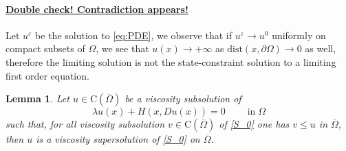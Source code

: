 \documentclass[11pt,reqno]{amsart}
\numberwithin{figure}{section}
\theoremstyle{plain}
\newtheorem{lem}[thm]{Lemma}
\theoremstyle{remark}
\numberwithin{equation}{section}
\newcommand{\rmC}{\mathrm{C}}
\begin{document}
\color{blue} 
\paragraph{\underline{\textbf{Double check! Contradiction appears!}}} Let $u^\varepsilon$ be the solution to \eqref{eq:PDE}, we observe that if $u^\varepsilon\rightarrow u^0$ uniformly on compact subsets of $\Omega$, we see that $u(x)\rightarrow +\infty$ as $\mathrm{dist}(x,\partial \Omega)\to 0$ as well, therefore the limiting solution is not the state-constraint solution to a limiting first order equation.
\color{black}

\begin{lem}\label{lem:max} Let $u\in \rmC(\overline{\Omega})$ be a viscosity subsolution of
\begin{equation}\label{S_0}
 \lambda u(x) + H(x,Du(x)) = 0\;\qquad\text{in}\;\Omega
\end{equation}
such that, for all viscosity subsolution $v\in \rmC(\overline{\Omega})$ of \eqref{S_0} one has $v\leq u$ in $\overline{\Omega}$, then $u$ is a viscosity supersolution of \eqref{S_0} on $\overline{\Omega}$.
\end{lem}
\end{document}

